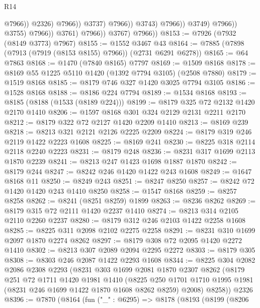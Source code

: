 \begin{lexlean}{R14}
\begin{coremodule}
                                                  @7966))
                                              @2326)
                                            @7966))
                                        @3737)
                                      @7966))
                                  @3743)
                                @7966))
                            @3749)
                          @7966))
                      @3755)
                    @7966))
                @3761)
              @7966))
          @3767)
        @7966))
@8153 := @7926 (@7932 (@8149 @3773) @7967)
@8155 := @1552 @3467 @43
@8164 := @7885 (@7898 (@7913 (@7919 (@8153 @8155) @7966)) (@2731 @6291 @6278))
@8165 := @64 @7863
@8168 := @1470 (@7840 @8165) @7797
@8169 := @1509 @8168
@8178 := @8169 @55 @1225 @5110 @1420 (@1392 @7794 @3105) (@2508 @7880)
@8179 := @1519 @8168
@8185 := @8179 @746 @327 @1420 @3025 @7794 @3105
@8186 := @1528 @8168
@8188 := @8186 @224 @7794
@8189 := @1534 @8168
@8193 := @8185 (@8188 (@1533 (@8189 @224)))
@8199 := @8179 @325 @72 @2132 @1420 @2170 @1410
@8206 := @1597 @8168 @301 @324 @2129 @2131 @2211 @2170
@8212 := @8179 @322 @72 @2127 @1420 @2209 @1410
@8213 := @8169 @239
@8218 := @8213 @321 @2121 @2126 @2225 @2209
@8224 := @8179 @319 @246 @2119 @1422 @2223 @1608
@8225 := @8169 @241
@8230 := @8225 @318 @2114 @2118 @2240 @2223
@8231 := @8179 @248
@8236 := @8231 @317 @1699 @2113 @1870 @2239
@8241 := @8213 @247 @1423 @1698 @1887 @1870
@8242 := @8179 @244
@8247 := @8242 @246 @1420 @1422 @243 @1608
@8249 := @1647 @8168 @11
@8250 := @8249 @243
@8251 := @8247 @8250
@8257 := @8242 @72 @1420 @1420 @243 @1410 @8250
@8258 := @1547 @8168
@8259 := @8257 @8258
@8262 := @8241 (@8251 @8259) @1899
@8263 := @8236 @8262
@8269 := @8179 @315 @72 @2111 @1420 @2237 @1410
@8274 := @8213 @314 @2105 @2110 @2260 @2237
@8280 := @8179 @312 @246 @2103 @1422 @2258 @1608
@8285 := @8225 @311 @2098 @2102 @2275 @2258
@8291 := @8231 @310 @1699 @2097 @1870 @2274 @8262
@8297 := @8179 @308 @72 @2095 @1420 @2272 @1410
@8302 := @8213 @307 @2089 @2094 @2295 @2272
@8303 := @8179 @305
@8308 := @8303 @246 @2087 @1422 @2293 @1608
@8344 := @8225
    @304
    @2082
    @2086
    @2308
    @2293
    (@8231
      @303
      @1699
      @2081
      @1870
      @2307
      @8262
      (@8179
        @251
        @72
        @1711
        @1420
        @1981
        @1410
        (@8225 @250 @1701 @1710 @1995 @1981 (@8231 @246 @1699 @1422 @1870 @1608 @8262 @8259) @2008)
        @8258))
    @2326
@8396 := @7870
    (@8164
      (fun ("_" : @6295) =>
      @8178
        (@8193
          (@8199
            (@8206

\end{coremodule}
\end{lexlean}
